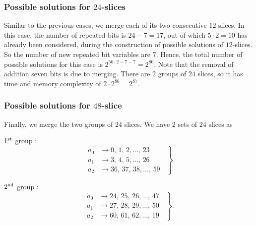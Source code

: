 \documentclass[runningheads]{llncs}
\begin{document}
\subsubsection{Possible solutions for $24$-slices}  
Similar to the previous cases, we merge each of its two consecutive  
$12$-slices. 
In this case, the number of repeated bits is $24-7=17$, out of which $5\cdot 2=10$ has already been considered, during the construction of possible solutions of $12$-slices. So the number of new repeated bit variables are $7$.
Hence, the total number of possible solutions for this case is $2^{50\cdot 2 - 7 - 7} = 2^{86}$. Note that the removal of addition seven bits is due to merging. There are $2$ groups of $24$ slices, so it has time and memory complexity of $2 \cdot 2^{86} = 2^{87}$.\\


\subsubsection{Possible solutions for $48$-slice}
Finally, we merge the two groups of $24$ slices.
We have $2$ sets of $24$ slices as

$1^{\rm st}$ group :
\begin{equation}\label{48_sol_1}
	\left.
	\begin{aligned}
    	a_0 &\rightarrow 0,\, 1,\, 2, \ldots ,\, 23\\
    	a_1 &\rightarrow 3,\,4, \,5, \ldots ,\, 26\\
    	a_2 &\rightarrow 36,\,37,\,38, \ldots ,\, 59
    \end{aligned}
    \;\;\right\}
\end{equation}

$2^{\rm nd}$ group :
\begin{equation}\label{48_sol_2}
	\left.
	\begin{aligned}    
      a_0 & \rightarrow 24,\, 25,\, 26, \ldots , \,47\\
      a_1 & \rightarrow 27,\, 28, \,29, \ldots , \,50\\
      a_2 & \rightarrow 60,\, 61,\,62, \ldots , \,19
    \end{aligned}
	\;\;\right\}.
\end{equation}
\end{document}
